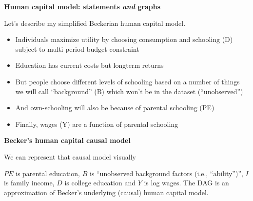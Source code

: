 \documentclass[notes=show]{beamer}
\begin{document}
\begin{frame}[plain]
\begin{center}
\textbf{Human capital model: statements \emph{and} graphs}
\end{center}

Let's describe my simplified Beckerian human capital model.
\begin{itemize}
\item Individuals maximize utility by choosing consumption and schooling (D) subject to multi-period budget constraint
\item Education has current costs but longterm returns 
\item But people choose different levels of schooling based on a number of things we will call ``background'' (B) which won't be in the dataset (``unobserved'')
\item And own-schooling will also be because of parental schooling (PE)
\item Finally, wages (Y) are a function of parental schooling 
\end{itemize}

\end{frame}

\begin{frame}[plain]
\begin{center}
\textbf{Becker's human capital causal model}
\end{center}

We can represent that causal model visually
\begin{center}
	\end{center}$PE$ is parental education, $B$ is ``unobserved background factors (i.e., ``ability'')'', $I$ is family income, $D$ is college education and $Y$ is log wages.  The DAG is an approximation of Becker's underlying (causal) human capital model. 


\end{frame}
\end{document}
